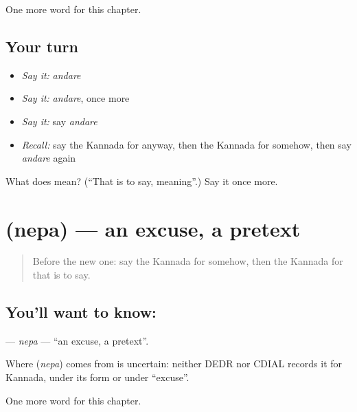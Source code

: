 \begin{grammarlens}[title={What you've built}]
One more word for this chapter.
\end{grammarlens}

\subsection*{Your turn}
\begin{itemize}
\raggedright
  \item \emph{Say it:} \emph{andare}
  \item \emph{Say it:} \emph{andare}, once more
  \item \emph{Say it:} say \emph{andare}
  \item \emph{Recall:} say the Kannada for anyway, then the Kannada for somehow, then say \emph{andare} again
\end{itemize}

\begin{tcolorbox}[breakable,colback=teal!4,colframe=teal!35!black,title={Before you move on}]
What does  mean? (\textquotedblleft{}That is to say, meaning\textquotedblright{}.) Say it once more.
\end{tcolorbox}
\section[\texorpdfstring{\kn{ನೆಪ} (nepa)}{ನೆಪ (nepa)}]{ (nepa) — an excuse, a pretext}

\label{lesson:KA-C289-nepa}



\begin{quote}
Before the new one: say the Kannada for somehow, then the Kannada for that is to say.
\end{quote}

\subsection*{You'll want to know: }
\textbf{} — \emph{nepa} — \textquotedblleft{}an excuse, a pretext\textquotedblright{}.

\begin{cousinweb}
Where \textbf{} (\emph{nepa}) comes from is uncertain: neither DEDR nor CDIAL records it for Kannada, under its form or under \textquotedblleft{}excuse\textquotedblright{}.
\end{cousinweb}

\begin{grammarlens}[title={What you've built}]
One more word for this chapter.
\end{grammarlens}

